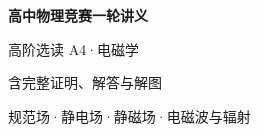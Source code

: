 \documentclass[UTF8,zihao=-4,oneside,openany]{ctexbook}
\begin{document}
\frontmatter
\begin{titlepage}
 \centering\vspace*{.25\textheight}
 {\Huge\bfseries 高中物理竞赛一轮讲义\par}\vspace{1.2em}
 {\Large 高阶选读 A4·电磁学\par}\vspace{.8em}
 {\large 含完整证明、解答与解图\par}\vfill
 {\color{TextGray}规范场·静电场·静磁场·电磁波与辐射\par}
\end{titlepage}
\tableofcontents
\mainmatter

\end{document}
